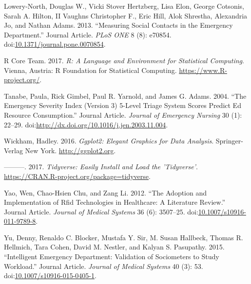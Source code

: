 \documentclass[]{elsarticle} %
\begin{document}
\hypertarget{ref-RN1X}{}
Lowery-North, Douglas W., Vicki Stover Hertzberg, Lisa Elon, George
Cotsonis, Sarah A. Hilton, II Vaughns Christopher F., Eric Hill, Alok
Shrestha, Alexandria Jo, and Nathan Adams. 2013. ``Measuring Social
Contacts in the Emergency Department.'' Journal Article. \emph{PLoS ONE}
8 (8): e70854.
doi:\href{https://doi.org/10.1371/journal.pone.0070854}{10.1371/journal.pone.0070854}.

\hypertarget{ref-CRAN}{}
R Core Team. 2017. \emph{R: A Language and Environment for Statistical
Computing}. Vienna, Austria: R Foundation for Statistical Computing.
\url{https://www.R-project.org/}.

\hypertarget{ref-RN251}{}
Tanabe, Paula, Rick Gimbel, Paul R. Yarnold, and James G. Adams. 2004.
``The Emergency Severity Index (Version 3) 5-Level Triage System Scores
Predict Ed Resource Consumption.'' Journal Article. \emph{Journal of
Emergency Nursing} 30 (1): 22--29.
doi:\href{https://doi.org/http://dx.doi.org/10.1016/j.jen.2003.11.004}{http://dx.doi.org/10.1016/j.jen.2003.11.004}.

\hypertarget{ref-GGPLOT2}{}
Wickham, Hadley. 2016. \emph{Ggplot2: Elegant Graphics for Data
Analysis}. Springer-Verlag New York. \url{http://ggplot2.org}.

\hypertarget{ref-TIDY}{}
---------. 2017. \emph{Tidyverse: Easily Install and Load the
'Tidyverse'}. \url{https://CRAN.R-project.org/package=tidyverse}.

\hypertarget{ref-RN257}{}
Yao, Wen, Chao-Hsien Chu, and Zang Li. 2012. ``The Adoption and
Implementation of Rfid Technologies in Healthcare: A Literature
Review.'' Journal Article. \emph{Journal of Medical Systems} 36 (6):
3507--25.
doi:\href{https://doi.org/10.1007/s10916-011-9789-8}{10.1007/s10916-011-9789-8}.

\hypertarget{ref-RN253}{}
Yu, Denny, Renaldo C. Blocker, Mustafa Y. Sir, M. Susan Hallbeck, Thomas
R. Hellmich, Tara Cohen, David M. Nestler, and Kalyan S. Pasupathy.
2015. ``Intelligent Emergency Department: Validation of Sociometers to
Study Workload.'' Journal Article. \emph{Journal of Medical Systems} 40
(3): 53.
doi:\href{https://doi.org/10.1007/s10916-015-0405-1}{10.1007/s10916-015-0405-1}.
\end{document}
